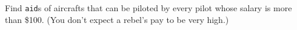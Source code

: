 Find \texttt{aid}s of aircrafts that can be piloted by every pilot whose salary is more than
\$100. (You don't expect a rebel's pay to be very high.)
